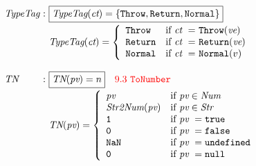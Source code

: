 \documentclass[a4paper, leqno]{amsart}
\def\inred{\color{red}}
\newcommand{\nullK}{{\tt null}}
\newcommand{\undef}{{\tt undefined}}
\newcommand{\false}{{\tt false}}
\newcommand{\true}{{\tt true}}
\newcommand{\bool}{\emph{Bool}}
\newcommand{\pval}{\emph{PVal}}
\newcommand{\pv}{\emph{pv}}
\newcommand{\loc}{\emph{Loc}}
\newcommand{\str}{\emph{Str}}
\newcommand{\num}{\emph{Num}}
\begin{document}
{\[\begin{array}{l@{}l@{}ll}

\emph{TypeTag} & \ : \ & \fbox{$\emph{TypeTag}(\emph{ct}) = \{{\tt Throw, Return, Normal}\}$}\\[.5em]
&&
\emph{TypeTag}(\emph{ct}) = \left\{ \begin{array}{ll}
{\tt Throw}  &\mbox{if $\emph{ct}\ =$ {\tt Throw}$(\emph{ve})$}\\
{\tt Return} &\mbox{if $\emph{ct}\ =$ {\tt Return}$(\emph{ve})$}\\
{\tt Normal} &\mbox{if $\emph{ct}\ =$ {\tt Normal}$(v)$}\\
\end{array}
\right.
\\\\


\emph{TN} & \ : \ & \fbox{$\emph{TN}(\pv) = n$}
\quad{\inred 9.3\ {\tt ToNumber}}\\[.5em]
&&
\emph{TN}(\pv) = \left\{ \begin{array}{ll}
\pv &\mbox{if $\pv\in\num$}\\
\emph{Str2Num}(\pv) &\mbox{if $\pv\in\str$}\\
{\tt 1} &\mbox{if $\pv\ = \true$}\\
{\tt 0} &\mbox{if $\pv\ = \false$}\\
{\tt NaN} &\mbox{if $\pv\ = \undef$}\\
{\tt 0} &\mbox{if $\pv\ = \nullK$}\\
\end{array}
\right.
\\\\


\end{array}\]}
\end{document}
